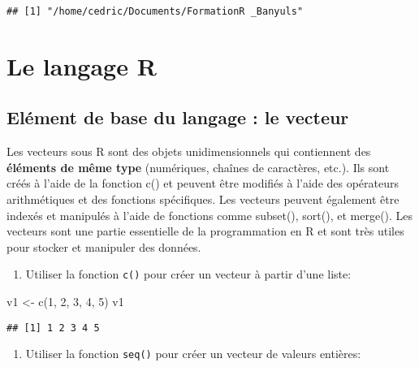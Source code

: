 \documentclass[
]{article}
\newenvironment{Shaded}{\begin{snugshade}}{\end{snugshade}}
\newcommand{\DecValTok}[1]{\textcolor[rgb]{0.00,0.00,0.81}{#1}}
\newcommand{\FunctionTok}[1]{\textcolor[rgb]{0.00,0.00,0.00}{#1}}
\newcommand{\NormalTok}[1]{#1}
\newcommand{\OtherTok}[1]{\textcolor[rgb]{0.56,0.35,0.01}{#1}}
\providecommand{\tightlist}{%
  \setlength{\itemsep}{0pt}\setlength{\parskip}{0pt}}
\begin{document}
\begin{verbatim}
## [1] "/home/cedric/Documents/FormationR _Banyuls"
\end{verbatim}

\hypertarget{le-langage-r}{%
\section{Le langage R}\label{le-langage-r}}

\hypertarget{eluxe9ment-de-base-du-langage-le-vecteur}{%
\subsection{Elément de base du langage : le vecteur}\label{eluxe9ment-de-base-du-langage-le-vecteur}}

Les vecteurs sous R sont des objets unidimensionnels qui contiennent des \textbf{éléments de même type}
(numériques, chaînes de caractères, etc.). Ils sont créés à l'aide de la fonction c() et peuvent être modifiés
à l'aide des opérateurs arithmétiques et des fonctions spécifiques. Les vecteurs peuvent également être indexés
et manipulés à l'aide de fonctions comme subset(), sort(), et merge(). Les vecteurs sont une partie
essentielle de la programmation en R et sont très utiles pour stocker et manipuler des données.

\begin{enumerate}
\def\labelenumi{\arabic{enumi}.}
\tightlist
\item
  Utiliser la fonction \texttt{c()} pour créer un vecteur à partir d'une liste:
\end{enumerate}

\begin{Shaded}
\begin{Highlighting}[]
\NormalTok{v1 }\OtherTok{\textless{}{-}} \FunctionTok{c}\NormalTok{(}\DecValTok{1}\NormalTok{, }\DecValTok{2}\NormalTok{, }\DecValTok{3}\NormalTok{, }\DecValTok{4}\NormalTok{, }\DecValTok{5}\NormalTok{)}
\NormalTok{v1}
\end{Highlighting}
\end{Shaded}

\begin{verbatim}
## [1] 1 2 3 4 5
\end{verbatim}

\begin{enumerate}
\def\labelenumi{\arabic{enumi}.}
\setcounter{enumi}{1}
\tightlist
\item
  Utiliser la fonction \texttt{seq()} pour créer un vecteur de valeurs entières:
\end{enumerate}
\end{document}
